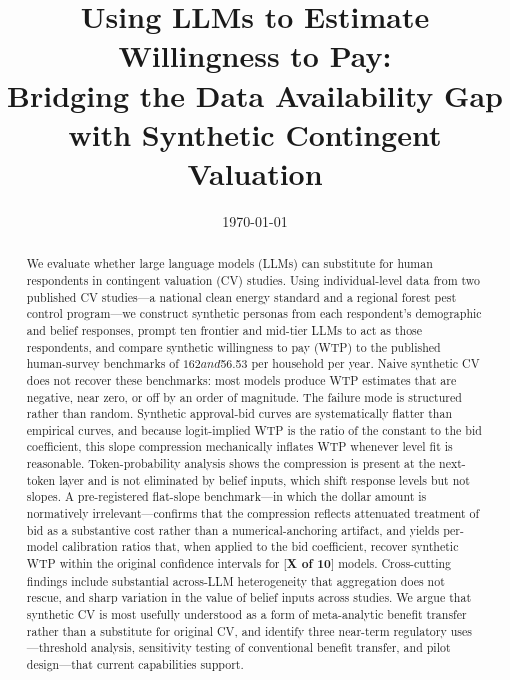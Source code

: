 \documentclass[12pt]{article}
\title{Using LLMs to Estimate Willingness to Pay: \\ Bridging the Data Availability Gap with Synthetic Contingent Valuation}
\date{\today}
\author{}
\begin{document}
\maketitle


\footnotesize
\begin{abstract}
We evaluate whether large language models (LLMs) can substitute for human respondents in contingent valuation (CV) studies. Using individual-level data from two published CV studies---a national clean energy standard and a regional forest pest control program---we construct synthetic personas from each respondent's demographic and belief responses, prompt ten frontier and mid-tier LLMs to act as those respondents, and compare synthetic willingness to pay (WTP) to the published human-survey benchmarks of $162 and $56.53 per household per year. Naive synthetic CV does not recover these benchmarks: most models produce WTP estimates that are negative, near zero, or off by an order of magnitude. The failure mode is structured rather than random. Synthetic approval-bid curves are systematically flatter than empirical curves, and because logit-implied WTP is the ratio of the constant to the bid coefficient, this slope compression mechanically inflates WTP whenever level fit is reasonable. Token-probability analysis shows the compression is present at the next-token layer and is not eliminated by belief inputs, which shift response levels but not slopes. A pre-registered flat-slope benchmark---in which the dollar amount is normatively irrelevant---confirms that the compression reflects attenuated treatment of bid as a substantive cost rather than a numerical-anchoring artifact, and yields per-model calibration ratios that, when applied to the bid coefficient, recover synthetic WTP within the original confidence intervals for [\textbf{X of 10}] models. Cross-cutting findings include substantial across-LLM heterogeneity that aggregation does not rescue, and sharp variation in the value of belief inputs across studies. We argue that synthetic CV is most usefully understood as a form of meta-analytic benefit transfer rather than a substitute for original CV, and identify three near-term regulatory uses---threshold analysis, sensitivity testing of conventional benefit transfer, and pilot design---that current capabilities support.
\end{abstract}

\newpage

%
\end{document}
